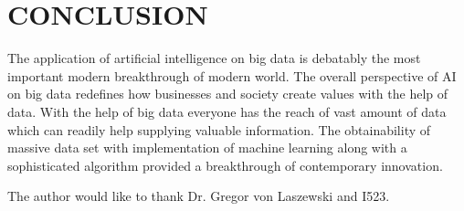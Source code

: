 \documentclass[sigconf]{acmart}
\begin{document}
\section{CONCLUSION}
The application of artificial intelligence on big data is debatably the most important modern breakthrough of modern world. The overall perspective of AI on big data redefines how businesses and society create values with the help of data. With the help of big data everyone has the reach of vast amount of data which can readily help supplying valuable information. The obtainability of massive data set with implementation of machine learning along with a sophisticated algorithm provided a breakthrough of contemporary innovation. 

\begin{acks}

  The author would like to thank Dr. Gregor von Laszewski and I523.

\end{acks}



 
\end{document}
